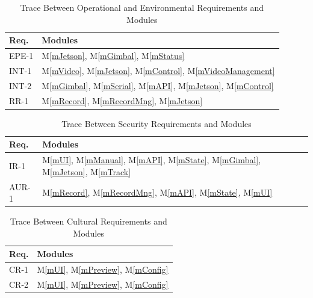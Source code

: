 \documentclass[12pt, titlepage]{article}
\newcommand{\mref}[1]{M\ref{#1}}
\begin{document}
\begin{table}[H]
  \centering
  \begin{tabular}{p{} p{}}
    \toprule
    \textbf{Req.} & \textbf{Modules}                                                             \\
    \midrule
    EPE-1         & \mref{mJetson}, \mref{mGimbal}, \mref{mStatus}                               \\
    INT-1         & \mref{mVideo}, \mref{mJetson}, \mref{mControl}, \mref{mVideoManagement}      \\
    INT-2         & \mref{mGimbal}, \mref{mSerial}, \mref{mAPI}, \mref{mJetson}, \mref{mControl} \\
    RR-1          & \mref{mRecord}, \mref{mRecordMng}, \mref{mJetson}                            \\
    \bottomrule
  \end{tabular}
  \caption{Trace Between Operational and Environmental Requirements and Modules}
  \label{TblOperationalModules}
\end{table}

\begin{table}[H]
  \centering
  \begin{tabular}{p{} p{}}
    \toprule
    \textbf{Req.} & \textbf{Modules}                                                                                      \\
    \midrule
    IR-1          & \mref{mUI}, \mref{mManual}, \mref{mAPI}, \mref{mState}, \mref{mGimbal}, \mref{mJetson}, \mref{mTrack} \\
    AUR-1         & \mref{mRecord}, \mref{mRecordMng}, \mref{mAPI}, \mref{mState}, \mref{mUI}                             \\
    \bottomrule
  \end{tabular}
  \caption{Trace Between Security Requirements and Modules}
  \label{TblSecurityModules}
\end{table}

\begin{table}[H]
  \centering
  \begin{tabular}{p{} p{}}
    \toprule
    \textbf{Req.} & \textbf{Modules}                            \\
    \midrule
    CR-1          & \mref{mUI}, \mref{mPreview}, \mref{mConfig} \\
    CR-2          & \mref{mUI}, \mref{mPreview}, \mref{mConfig} \\
    \bottomrule
  \end{tabular}
  \caption{Trace Between Cultural Requirements and Modules}
  \label{TblCulturalModules}
\end{table}
\end{document}
